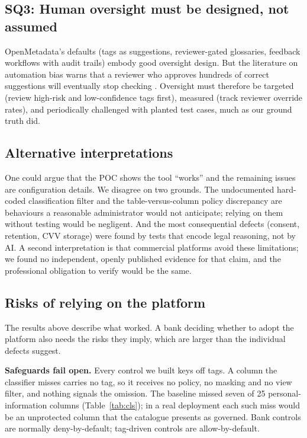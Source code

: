 \documentclass[journal,onecolumn,11pt]{IEEEtran}
\begin{document}
\subsection{SQ3: Human oversight must be designed, not assumed}
OpenMetadata's defaults (tags as suggestions, reviewer-gated glossaries, feedback workflows with audit trails) embody good oversight design. But the literature on automation bias warns that a reviewer who approves hundreds of correct suggestions will eventually stop checking \cite{parasuraman}. Oversight must therefore be targeted (review high-risk and low-confidence tags first), measured (track reviewer override rates), and periodically challenged with planted test cases, much as our ground truth did.

\subsection{Alternative interpretations}
One could argue that the POC shows the tool ``works'' and the remaining issues are configuration details. We disagree on two grounds. The undocumented hard-coded classification filter and the table-versus-column policy discrepancy are behaviours a reasonable administrator would not anticipate; relying on them without testing would be negligent. And the most consequential defects (consent, retention, CVV storage) were found by tests that encode legal reasoning, not by AI. A second interpretation is that commercial platforms avoid these limitations; we found no independent, openly published evidence for that claim, and the professional obligation to verify would be the same.

\subsection{Risks of relying on the platform}
The results above describe what worked. A bank deciding whether to adopt the platform also needs the risks they imply, which are larger than the individual defects suggest.

\textbf{Safeguards fail open.} Every control we built keys off tags. A column the classifier misses carries no tag, so it receives no policy, no masking and no view filter, and nothing signals the omission. The baseline missed seven of 25 personal-information columns (Table~\ref{tab:cls}); in a real deployment each such miss would be an unprotected column that the catalogue presents as governed. Bank controls are normally deny-by-default; tag-driven controls are allow-by-default.
\end{document}

